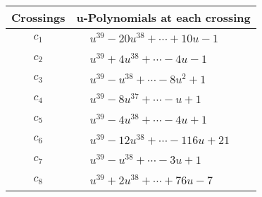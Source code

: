 \documentclass[1p]{elsarticle_modified}
\theoremstyle{definition}
\begin{document}
\begin{tabular}{m{50pt}|m{274pt}}
Crossings & \hspace{64pt}u-Polynomials at each crossing \\
\hline $$\begin{aligned}c_{1}\end{aligned}$$&$\begin{aligned}
&u^{39}-20 u^{38}+\cdots+10 u-1
\end{aligned}$\\
\hline $$\begin{aligned}c_{2}\end{aligned}$$&$\begin{aligned}
&u^{39}+4 u^{38}+\cdots-4 u-1
\end{aligned}$\\
\hline $$\begin{aligned}c_{3}\end{aligned}$$&$\begin{aligned}
&u^{39}- u^{38}+\cdots-8 u^2+1
\end{aligned}$\\
\hline $$\begin{aligned}c_{4}\end{aligned}$$&$\begin{aligned}
&u^{39}-8 u^{37}+\cdots- u+1
\end{aligned}$\\
\hline $$\begin{aligned}c_{5}\end{aligned}$$&$\begin{aligned}
&u^{39}-4 u^{38}+\cdots-4 u+1
\end{aligned}$\\
\hline $$\begin{aligned}c_{6}\end{aligned}$$&$\begin{aligned}
&u^{39}-12 u^{38}+\cdots-116 u+21
\end{aligned}$\\
\hline $$\begin{aligned}c_{7}\end{aligned}$$&$\begin{aligned}
&u^{39}- u^{38}+\cdots-3 u+1
\end{aligned}$\\
\hline $$\begin{aligned}c_{8}\end{aligned}$$&$\begin{aligned}
&u^{39}+2 u^{38}+\cdots+76 u-7
\end{aligned}$\\

\end{tabular}
\end{document}
